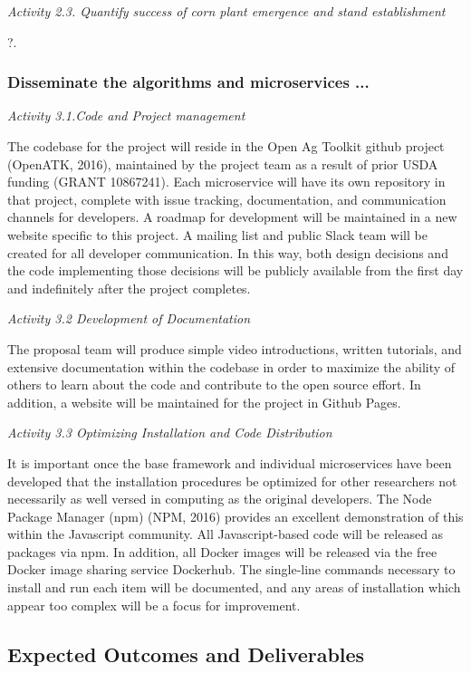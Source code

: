 \documentclass[11pt]{article}
\begin{document}
\noindent
{\em Activity 2.3. Quantify success of corn plant emergence and stand establishment}

?.

\subsubsection{Disseminate the algorithms and microservices ...}

\noindent
{\em Activity 3.1.Code and Project management}

The codebase for the project will reside in the Open Ag Toolkit github project (OpenATK, 2016), maintained by 
the project team as a result of prior USDA funding (GRANT 10867241).  Each microservice will have its own 
repository in that project, complete with issue tracking, documentation, and communication channels for 
developers.  A roadmap for development will be maintained in a new website specific to this project.  A mailing 
list and public Slack team will be created for all developer communication.  In this way, both design decisions 
and the code implementing those decisions will be publicly available from the first day and indefinitely after the 
project completes.

\noindent
{\em Activity 3.2 Development of Documentation}

The proposal team will produce simple video introductions, written tutorials, and extensive documentation 
within the codebase in order to maximize the ability of others to learn about the code and contribute to the 
open source effort.  In addition, a website will be maintained for the project in Github Pages.

\noindent
{\em Activity 3.3 Optimizing Installation and Code Distribution}

It is important once the base framework and individual microservices have been developed that the installation 
procedures be optimized for other researchers not necessarily as well versed in computing as the original 
developers.  The Node Package Manager (npm) (NPM, 2016) provides an excellent demonstration of this 
within the Javascript community.  All Javascript-based code will be released as packages via npm.  In addition, 
all Docker images will be released via the free Docker image sharing service Dockerhub.  The single-line 
commands necessary to install and run each item will be documented, and any areas of installation which 
appear too complex will be a focus for improvement.

\subsection{Expected Outcomes and Deliverables}
\end{document}

